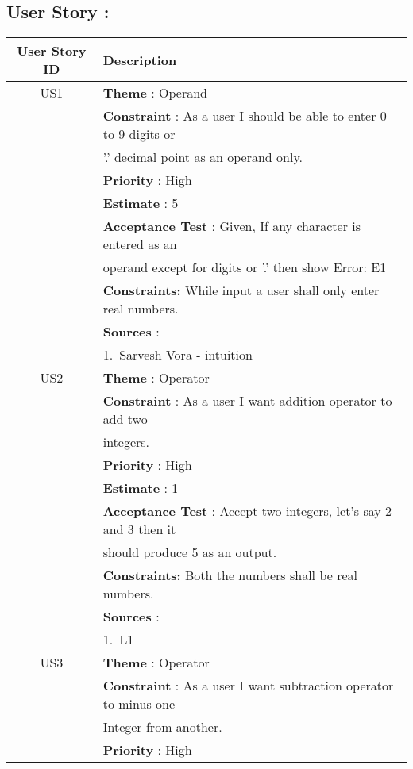 \documentclass{article}
\begin{document}
\subsection{User Story : }
\begin{longtable}{|| c || l ||}
        \hline
        \hline
        \textbf{User Story ID} & \textbf{Description} \\
        \hline
        \hline
         US1 & \textbf{Theme} : Operand \\
         & \textbf{Constraint} : As a user I should be able to enter 0 to 9 digits or \\ & '.' decimal point as an operand only. \\ 
         & \textbf{Priority} : High \\
         & \textbf{Estimate} : 5 \\
         & \textbf{Acceptance Test} : Given, If any character is entered as an \\
         & operand except for digits or '.' then show Error: E1 \\
         & \textbf{Constraints: } While input a user shall only enter real numbers.\\
         & \textbf{Sources} : \\
         & 1.~Sarvesh Vora - intuition \\
         \hline
         US2 & \textbf{Theme} : Operator \\
         & \textbf{Constraint} : As a user I want addition operator to add two \\
         & integers. \\
         & \textbf{Priority} : High \\
         & \textbf{Estimate} : 1 \\
         & \textbf{Acceptance Test} : Accept two integers, let's say 2 and 3 then it \\
         & should produce 5 as an output. \\
         & \textbf{Constraints: } Both the numbers shall be real numbers.\\
         & \textbf{Sources} : \\
         & 1.~L1 \\
         \hline
         US3 & \textbf{Theme} : Operator \\
         & \textbf{Constraint} : As a user I want subtraction operator to minus one \\ 
         & Integer from another. \\
         & \textbf{Priority} : High \\

\end{longtable}
\end{document}
